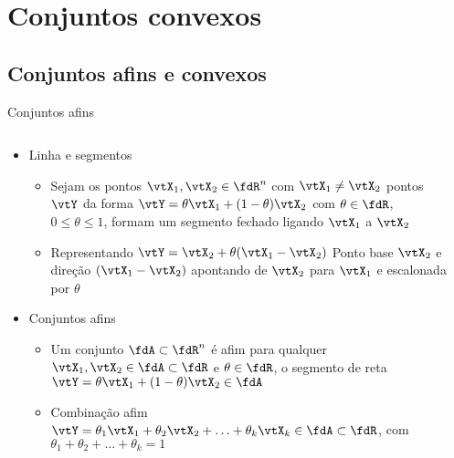 \section{Conjuntos convexos}

\subsection{Conjuntos afins e convexos}

\begin{frame}{Conjuntos afins}
  \begin{columns}
    \begin{column}{0.63\linewidth}
      \begin{itemize}\addtolength{\itemsep}{\baselineskip}
        \item Linha e segmentos
        \begin{itemize}
        \item Sejam os pontos $ \vtX_1, \vtX_2 \in \fdR^n $ com $ \vtX_1 \neq \vtX_2 $  pontos $ \vtY $ da
          forma $ \vtY = \theta\vtX_1 + (1-\theta)\vtX_2 $ com $ \theta \in \fdR$, $ 0 \leq \theta \leq 1 $, formam um
          segmento fechado ligando $ \vtX_1 $ a $ \vtX_2 $
          \item Representando $ \vtY = \vtX_2 + \theta(\vtX_1 - \vtX_2) $  Ponto base $ \vtX_2 $ e direção $ 
          (\vtX_1 - \vtX_2) $ apontando de $ \vtX_2 $ para $ \vtX_1 $ e escalonada por $ \theta $
        \end{itemize}
        
        \item Conjuntos afins 
        \begin{itemize}
          \item Um conjunto $ \fdA\subset \fdR^n$ é afim  para qualquer $ \vtX_1, \vtX_2 \in \fdA\subset 
          \fdR$ e $ \theta \in \fdR $, o segmento de reta $ \vtY =  \theta\vtX_1 + (1-\theta)\vtX_2 \in \fdA$
          \item Combinação afim  $ \vtY = \theta_1 \vtX_1 + \theta_2 \vtX_2 + \ldots + \theta_k \vtX_k \in 
          \fdA\subset \fdR $, com $ \theta_1 + \theta_2 + \ldots + \theta_k = 1 $
        \end{itemize}
      \end{itemize}
    \end{column}
    \begin{column}{0.33\linewidth}
      \centering
      

\end{column}
\end{columns}
\end{frame}
